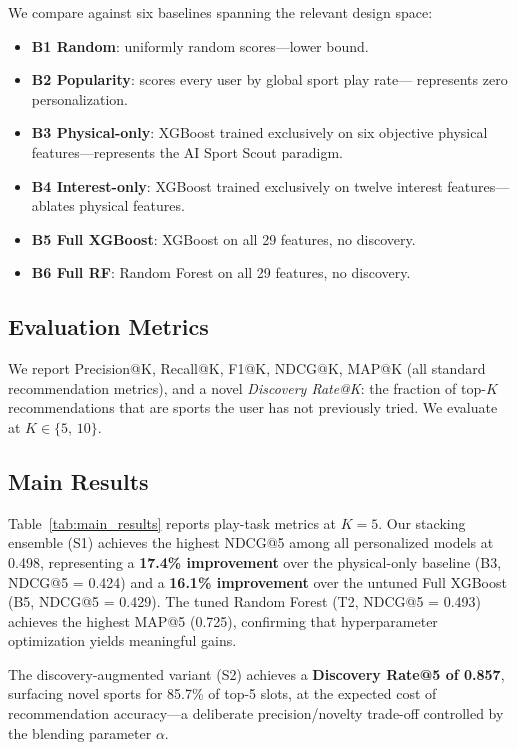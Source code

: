 \documentclass[conference]{IEEEtran}
\begin{document}
We compare against six baselines spanning the relevant design space:

\begin{itemize}
  \item \textbf{B1 Random}: uniformly random scores---lower bound.
  \item \textbf{B2 Popularity}: scores every user by global sport play rate---
        represents zero personalization.
  \item \textbf{B3 Physical-only}: XGBoost trained exclusively on six
        objective physical features---represents the AI Sport Scout paradigm.
  \item \textbf{B4 Interest-only}: XGBoost trained exclusively on twelve
        interest features---ablates physical features.
  \item \textbf{B5 Full XGBoost}: XGBoost on all 29 features, no discovery.
  \item \textbf{B6 Full RF}: Random Forest on all 29 features, no discovery.
\end{itemize}

\subsection{Evaluation Metrics}

We report Precision@K, Recall@K, F1@K, NDCG@K, MAP@K (all standard
recommendation metrics), and a novel \textit{Discovery Rate@K}: the fraction
of top-$K$ recommendations that are sports the user has not previously tried.
We evaluate at $K \in \{5,\, 10\}$.

\subsection{Main Results}

Table~\ref{tab:main_results} reports play-task metrics at $K{=}5$.
Our stacking ensemble (S1) achieves the highest NDCG@5 among all
personalized models at 0.498, representing a \textbf{17.4\% improvement}
over the physical-only baseline (B3, NDCG@5 = 0.424) and a \textbf{16.1\%
improvement} over the untuned Full XGBoost (B5, NDCG@5 = 0.429).
The tuned Random Forest (T2, NDCG@5 = 0.493) achieves the highest MAP@5
(0.725), confirming that hyperparameter optimization yields meaningful gains.

The discovery-augmented variant (S2) achieves a \textbf{Discovery Rate@5 of
0.857}, surfacing novel sports for 85.7\% of top-5 slots, at the expected
cost of recommendation accuracy---a deliberate precision/novelty trade-off
controlled by the blending parameter $\alpha$.
\end{document}
